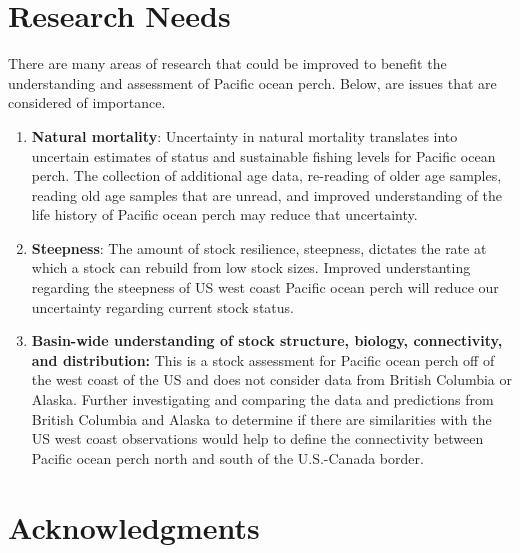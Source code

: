 \documentclass[12pt,]{article}
\begin{document}
\section{Research Needs}\label{research-needs}

There are many areas of research that could be improved to benefit the
understanding and assessment of Pacific ocean perch. Below, are issues
that are considered of importance.

\begin{enumerate}

\item \textbf{Natural mortality}: Uncertainty in natural mortality translates into uncertain estimates of status and sustainable fishing levels for Pacific ocean perch. The collection of additional age data, re-reading of older age samples, reading old age samples that are unread, and improved understanding of the life history of Pacific ocean perch may reduce that uncertainty.

\item \textbf{Steepness}: The amount of stock resilience, steepness, dictates the rate at which a stock can rebuild from low stock sizes.  Improved understanting regarding the steepness of US west coast Pacific ocean perch will reduce our uncertainty regarding current stock status.

\item \textbf{Basin-wide understanding of stock structure, biology, connectivity, and distribution:} This is a stock assessment for Pacific ocean perch off of the west coast of the US and does not consider data from British Columbia or Alaska. Further investigating and comparing the data and predictions from British Columbia and Alaska to determine if there are similarities with the US west coast observations would help to define the connectivity between Pacific ocean perch north and south of the U.S.-Canada border.


\end{enumerate}

\section{Acknowledgments}\label{acknowledgments}
\end{document}
